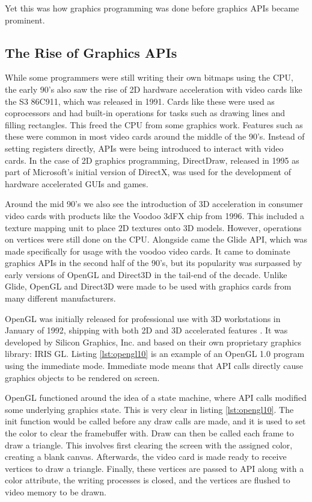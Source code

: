 Yet this was how graphics programming was done before graphics \glspl{API} became prominent.


\subsection{The Rise of Graphics \acs{API}s} 
While some programmers were still writing their own bitmaps using the \gls{CPU}, the early 90’s also saw the rise of 2D hardware acceleration with video cards like the S3 86C911, which was released in 1991.
Cards like these were used as coprocessors and had built-in operations for tasks such as drawing lines and filling rectangles.
This freed the \gls{CPU} from some graphics work. 
Features such as these were common in most video cards around the middle of the 90’s. Instead of setting registers directly, \glspl{API} were being introduced to interact with video cards. 
In the case of 2D graphics programming, DirectDraw, released in 1995 as part of Microsoft’s initial version of DirectX, was used for the development of hardware accelerated \glspl{GUI} and games. \cite{ wikiGpu}


Around the mid 90’s we also see the introduction of 3D acceleration in consumer video cards with products like the Voodoo 3dFX chip from 1996.
This included a texture mapping unit to place 2D textures onto 3D models.
However, operations on vertices were still done on the \gls{CPU}. 
Alongside came the Glide \gls{API}, which was made specifically for usage with the voodoo video cards.
It came to dominate graphics \glspl{API} in the second half of the 90's, but its popularity was surpassed by early versions of OpenGL and Direct3D in the tail-end of the decade. 
Unlike Glide, OpenGL and Direct3D were made to be used with graphics cards from many different manufacturers. \cite{wiki3dfxInteractive}


OpenGL was initially released for professional use with 3D workstations in January of 1992, shipping with both 2D and 3D accelerated features \cite{segal1994opengl}. 
It was developed by Silicon Graphics, Inc. and based on their own proprietary graphics library: \gls{IRIS GL}. 
Listing \ref{lst:opengl10} is an example of an OpenGL 1.0 program using the immediate mode. 
Immediate mode means that \gls{API} calls directly cause graphics objects to be rendered on screen.


OpenGL functioned around the idea of a state machine, where \gls{API} calls modified some underlying graphics state.
This is very clear in listing \ref{lst:opengl10}.
The init function would be called before any draw calls are made, and it is used to set the color to clear the framebuffer with. 
Draw can then be called each frame to draw a triangle. 
This involves first clearing the screen with the assigned color, creating a blank canvas. 
Afterwards, the video card is made ready to receive vertices to draw a triangle. 
Finally, these vertices are passed to \gls{API} along with a color attribute, the writing processes is closed, and the vertices are flushed to video memory to be drawn.



